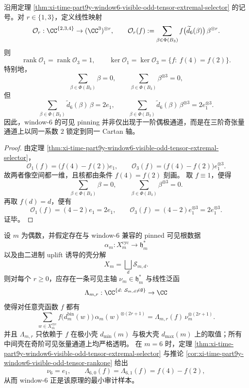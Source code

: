 \begin{corollary}\label{cor:xi-time-part9y-window6-visible-odd-tensor-rankone}
沿用定理 \ref{thm:xi-time-part9y-window6-visible-odd-tensor-extremal-selector} 的记号。对 \(r\in\{1,3\}\)，定义线性映射
\[
\mathcal O_r:\CC^{\{2,3,4\}}\to (\CC^3)^{\otimes r},
\qquad
\mathcal O_r(f):=\sum_{\beta\in\Phi(B_3)} f\bigl(\widetilde d_6(\beta)\bigr)\,\beta^{\otimes r}.
\]
则
\[
\operatorname{rank}\mathcal O_1=\operatorname{rank}\mathcal O_3=1,
\qquad
\ker\mathcal O_1=\ker\mathcal O_3=\{f:\ f(4)=f(2)\}.
\]
特别地，
\[
\sum_{\beta\in\Phi(B_3)}\beta=0,
\qquad
\sum_{\beta\in\Phi(B_3)}\beta^{\otimes 3}=0,
\]
但
\[
\sum_{\beta\in\Phi(B_3)}\widetilde d_6(\beta)\,\beta=2e_1,
\qquad
\sum_{\beta\in\Phi(B_3)}\widetilde d_6(\beta)\,\beta^{\otimes 3}=2e_1^{\otimes 3}.
\]
因此，window-\(6\) 的可见 pinning 并非仅出现于一阶偶极通道，而是在三阶奇张量通道上以同一系数 \(2\) 锁定到同一 Cartan 轴。
\end{corollary}
\begin{proof}
由定理 \ref{thm:xi-time-part9y-window6-visible-odd-tensor-extremal-selector}，
\[
\mathcal O_1(f)=\bigl(f(4)-f(2)\bigr)e_1,
\qquad
\mathcal O_3(f)=\bigl(f(4)-f(2)\bigr)e_1^{\otimes 3}.
\]
故两者像空间都一维，且核都由条件 \(f(4)=f(2)\) 刻画。
取 \(f\equiv 1\)，便得
\[
\sum_{\beta\in\Phi(B_3)}\beta=0,
\qquad
\sum_{\beta\in\Phi(B_3)}\beta^{\otimes 3}=0.
\]
再取 \(f(d)=d\)，便有
\[
\mathcal O_1(f)=(4-2)e_1=2e_1,
\qquad
\mathcal O_3(f)=(4-2)e_1^{\otimes 3}=2e_1^{\otimes 3}.
\]
证毕。
\end{proof}

\begin{conjecture}\label{conj:xi-time-part9y-even-window-visible-odd-tensor-extremal-shell-rankone}
设 \(m\) 为偶数，并假定存在与 window-\(6\) 兼容的 pinned 可见根数据
\[
\alpha_m:X_m^{\mathrm{cyc}}\to \mathfrak h_m^\ast
\]
以及由二进制 uplift 诱导的壳分解
\[
X_m=\bigsqcup_d \mathcal S_{m,d}.
\]
则对每个 \(r\ge 0\)，应存在一条可见主轴 \(\nu_m\in \mathfrak h_m^\ast\) 与线性泛函
\[
\Lambda_{m,r}:\CC^{\{d:\ \mathcal S_{m,d}\neq\emptyset\}}\to \CC
\]
使得对任意壳函数 \(f\) 都有
\[
\sum_{w\in X_m^{\mathrm{cyc}}}
f\bigl(d_m^{\mathrm{bin}}(w)\bigr)\,
\alpha_m(w)^{\otimes(2r+1)}
=
\Lambda_{m,r}(f)\,\nu_m^{\otimes(2r+1)}.
\]
并且 \(\Lambda_{m,r}\) 只依赖于 \(f\) 在极小壳 \(d_{\min}(m)\) 与极大壳 \(d_{\max}(m)\) 上的取值；所有中间壳在奇阶可见张量通道上均严格透明。
在 \(m=6\) 时，定理 \ref{thm:xi-time-part9y-window6-visible-odd-tensor-extremal-selector} 与推论 \ref{cor:xi-time-part9y-window6-visible-odd-tensor-rankone} 给出
\[
\nu_6=e_1,
\qquad
\Lambda_{6,0}(f)=\Lambda_{6,1}(f)=f(4)-f(2),
\]
从而 window-\(6\) 正是该原理的最小审计样本。
\end{conjecture}

